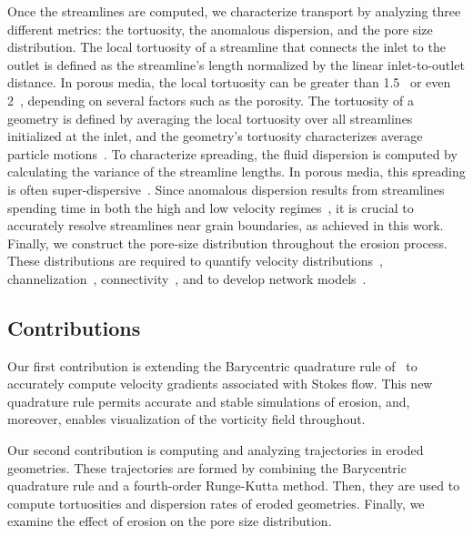 \documentclass{jfm}
\begin{document}
Once the streamlines are computed, we characterize transport by
analyzing three different metrics: the tortuosity, the anomalous
dispersion, and the pore size distribution.  The local tortuosity of a
streamline that connects the inlet to the outlet is defined as the
streamline's length normalized by the linear inlet-to-outlet distance.
In porous media, the local tortuosity can be greater than
1.5~\citep{kop-kat-tim1996, mat-kha-koz2008} or even
2~\citep{dud-koz-mat2011}, depending on several factors such as the
porosity. The tortuosity of a geometry is defined by averaging the local
tortuosity over all streamlines initialized at the inlet, and the
geometry's tortuosity characterizes average particle
motions~\citep{hak-com-den2019}.  To characterize spreading, the fluid
dispersion is computed by calculating the variance of the streamline
lengths. In porous media, this spreading is often
super-dispersive~\citep{kan-dea-nun-bij-blu-jua2014, cus-hu-den1995,
dea-leb-den-tar-bol-dav2013}. Since anomalous dispersion results from
streamlines spending time in both the high and low velocity
regimes~\citep{ber-sch2001}, it is crucial to accurately resolve
streamlines near grain boundaries, as achieved in this work.  Finally,
we construct the pore-size distribution throughout the erosion process.
These distributions are required to quantify velocity
distributions~\citep{ali-par-wei-bre2017, dea-qua-bir-jua2018},
channelization~\citep{sie-ili-pri-riv-gua2019},
connectivity~\citep{knu-car2005, wes-blo-gra2001}, and to develop
network models~\citep{bry-kin-mel1993, bry-mel-cad1993, bij-blu2006}. 

\subsection{Contributions}
Our first contribution is extending the Barycentric quadrature rule
of~\citet{bar-wu-vee2015} to accurately compute velocity gradients
associated with Stokes flow. This new quadrature rule permits accurate
and stable simulations of erosion, and, moreover, enables visualization
of the vorticity field throughout.

Our second contribution is computing and analyzing trajectories in
eroded geometries.  These trajectories are formed by combining the
Barycentric quadrature rule and a fourth-order Runge-Kutta method. Then,
they are used to compute tortuosities and dispersion rates of eroded
geometries. Finally, we examine the effect of erosion on the pore size
distribution.
\end{document}
